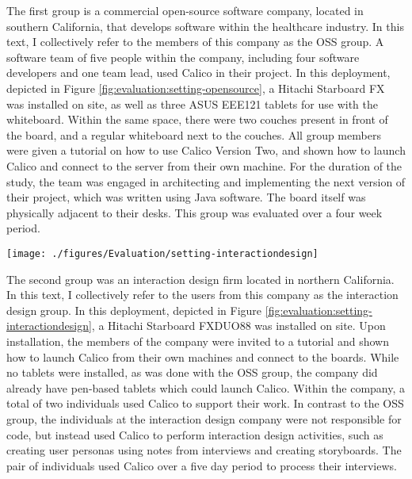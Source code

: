 The first group is a commercial open-source software company, located in southern California, that develops software within the healthcare industry. In this text, I collectively refer to the members of this company as the OSS group. A software team of five people within the company, including four software developers and one team lead, used Calico in their project. In this deployment, depicted in Figure \ref{fig:evaluation:setting-opensource}, a Hitachi Starboard FX was installed on site, as well as three ASUS EEE121 tablets for use with the whiteboard. Within the same space, there were two couches present in front of the board, and a regular whiteboard next to the couches. All group members were given a tutorial on how to use Calico Version Two, and shown how to launch Calico and connect to the server from their own machine.  For the duration of the study, the team was engaged in architecting and implementing the next version of their project, which was written using Java software. The board itself was physically adjacent to their desks. This group was evaluated over a four week period.

\begin{figure*}[tbh]
  \centering
  \texttt{[image: ./figures/Evaluation/setting-interactiondesign]}
  \caption{A tutorial of the usage of Calico given to the interaction design group.}
  \label{fig:evaluation:setting-interactiondesign}
\end{figure*}

The second group was an interaction design firm located in northern California. In this text, I collectively refer to the users from this company as the interaction design group. In this deployment, depicted in Figure \ref{fig:evaluation:setting-interactiondesign}, a Hitachi Starboard FXDUO88 was installed on site. Upon installation, the members of the company were invited to a tutorial and shown how to launch Calico from their own machines and connect to the boards. While no tablets were installed, as was done with the OSS group, the company did already have pen-based tablets which could launch Calico. Within the company, a total of two individuals used Calico to support their work. In contrast to the OSS group, the individuals at the interaction design company were not responsible for code, but instead used Calico to perform interaction design activities, such as creating user personas using notes from interviews and creating storyboards. The pair of individuals used Calico over a five day period to process their interviews.

